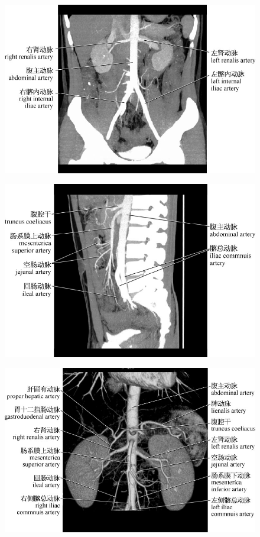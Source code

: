\begin{figure}[!htbp]
 \centering
 \includegraphics{./images/Image00200.jpg}
  \end{figure} 
 \FloatBarrier

\begin{figure}[!htbp]
 \centering
 \includegraphics{./images/Image00201.jpg}
  \end{figure} 
 \FloatBarrier

\begin{figure}[!htbp]
 \centering
 \includegraphics{./images/Image00202.jpg}
  \end{figure} 
 \FloatBarrier

